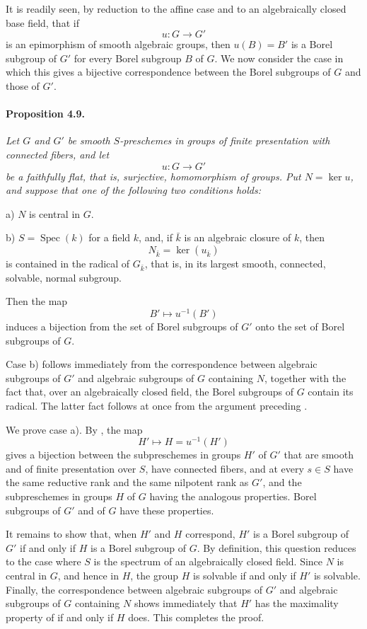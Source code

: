 
It is readily seen, by reduction to the affine case and to an
algebraically closed base field, that if
\[
  u\colon G\longrightarrow G'
\]
is an epimorphism of smooth algebraic groups, then \(u(B)=B'\) is a
Borel subgroup of \(G'\) for every Borel subgroup \(B\) of \(G\).
We now consider the case in which this gives a bijective
correspondence between the Borel subgroups of \(G\) and those of
\(G'\).

\paragraph{\textbf{Proposition 4.9.}}
{\itshape Let \(G\) and \(G'\) be smooth \(S\)-preschemes in groups
of finite presentation with connected fibers, and let
\[
  u\colon G\longrightarrow G'
\]
be a faithfully flat, that is, surjective, homomorphism of
groups. Put \(N=\ker u\), and suppose that one of the following
two conditions holds:

\smallskip
\noindent
\textup{a)} \(N\) is central in \(G\).

\smallskip
\noindent
\textup{b)} \(S=\operatorname{Spec}(k)\) for a field \(k\), and, if
\(\bar k\) is an algebraic closure of \(k\), then
\[
  N_{\bar k}=\ker(u_{\bar k})
\]
is contained in the radical of \(G_{\bar k}\), that is, in its
largest smooth, connected, solvable, normal subgroup.

\smallskip
Then the map
\[
  B'\longmapsto u^{-1}(B')
\]
induces a bijection from the set of Borel subgroups of \(G'\) onto
the set of Borel subgroups of \(G\).}

Case \textup{b)} follows immediately from the correspondence between
algebraic subgroups of \(G'\) and algebraic subgroups of \(G\)
containing \(N\), together with the fact that, over an algebraically
closed field, the Borel subgroups of \(G\) contain its radical. The
latter fact follows at once from the argument preceding .

We prove case \textup{a)}. By , the map
\[
  H'\longmapsto H=u^{-1}(H')
\]
gives a bijection between the subpreschemes in groups \(H'\) of
\(G'\) that are smooth and of finite presentation over \(S\), have
connected fibers, and at every \(s\in S\) have the same reductive
rank and the same nilpotent rank as \(G'\), and the subpreschemes
in groups \(H\) of \(G\) having the analogous properties. Borel
subgroups of \(G'\) and of \(G\) have these properties.

It remains to show that, when \(H'\) and \(H\) correspond, \(H'\)
is a Borel subgroup of \(G'\) if and only if \(H\) is a Borel
subgroup of \(G\). By definition, this question reduces to the case
where \(S\) is the spectrum of an algebraically closed field. Since
\(N\) is central in \(G\), and hence in \(H\), the group \(H\) is
solvable if and only if \(H'\) is solvable. Finally, the
correspondence between algebraic subgroups of \(G'\) and algebraic
subgroups of \(G\) containing \(N\) shows immediately that \(H'\)
has the maximality property of  if and only if \(H\)
does. This completes the proof.

